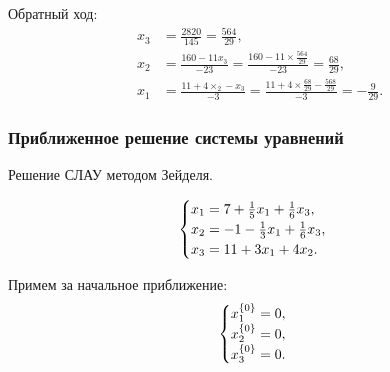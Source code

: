 \documentclass[10pt, a4paper, titlepage]{article}
\begin{document}
Обратный ход:
\begin{align*}
x_3 &= \frac{2820}{145}=\frac{564}{29}, \\
x_2 &= \frac{160-11x_3}{-23}=\frac{160-11\times\frac{564}{29}}{-23}=\frac{68}{29}, \\
x_1 &= \frac{11+4\times_2-x_3}{-3}=\frac{11+4\times\frac{68}{29}-\frac{568}{29}}{-3}=-\frac{9}{29}.
\end{align*}

\subsubsection*{Приближенное решение системы уравнений}

Решение СЛАУ методом Зейделя.

\begin{equation*}
    \begin{cases}
        $$x_1=7+\frac{1}{5}x_1+\frac{1}{6}x_3$$, \\
        $$x_2=-1-\frac{1}{3}x_1+\frac{1}{6}x_3$$, \\
        $$x_3=11+3x_1+4x_2$$.
    \end{cases}
\end{equation*}

Примем за начальное приближение:
\begin{equation*}
    \begin{cases}
        $$x_1^{\{0\}}=0$$, \\
        $$x_2^{\{0\}}=0$$, \\
        $$x_3^{\{0\}}=0$$.
    \end{cases}
\end{equation*}
\end{document}
